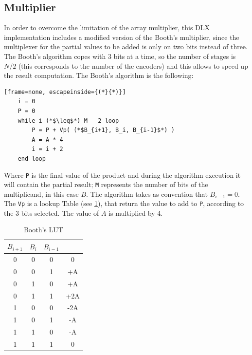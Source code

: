 \subsection{Multiplier}
In order to overcome the limitation of the array multiplier, this DLX implementation includes a modified version of the Booth's multiplier, since the multiplexer for the partial values to be added is only on two bits instead of three. The Booth's algorithm copes with 3 bits at a time, so the number of stages is $N/2$ (this corresponds to the number of the encoders) and this allows to speed up the result computation. 
The Booth's algorithm is the following:
\begin{lstlisting}[frame=none, escapeinside={(*}{*)}]
    i = 0
    P = 0
    while i (*$\leq$*) M - 2 loop
        P = P + Vp( (*$B_{i+1}, B_i, B_{i-1}$*) )
        A = A * 4
        i = i + 2
    end loop
\end{lstlisting}
Where \texttt{P} is the final value of the product and during the algorithm execution it will contain the partial result; \texttt{M} represents the number of bits of the multiplicand, in this case $B$. The algorithm takes as convention that $B_{i-1} = 0$. The \texttt{Vp} is a lookup Table (see \ref{mult:lut}), that return the value to add to \texttt{P}, according to the 3 bits selected. The value of $A$ is multiplied by 4.

\begin{table}[H]
    \begin{center}
        \begin{tabular}{ c c c | c}
            $B_{i+1}$ & $B_{i}$ & $B_{i-1}$ & \\
            \hline 
            0 & 0 & 0 & 0\\ 
            0 & 0 & 1 & +A\\ 
            0 & 1 & 0 & +A\\ 
            0 & 1 & 1 & +2A\\ 
            1 & 0 & 0 & -2A\\ 
            1 & 0 & 1 & -A\\ 
            1 & 1 & 0 & -A\\ 
            1 & 1 & 1 & 0\\ 
        \end{tabular}
        \caption{Booth's LUT}
        \label{mult:lut}
    \end{center}
\end{table}

